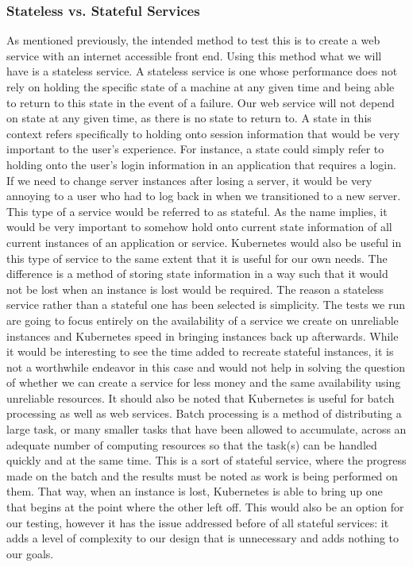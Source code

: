 \documentclass[thesis,proposal]{umassthesis}  %
\begin{document}
\subsubsection{Stateless vs. Stateful Services}
	As mentioned previously, the intended method to test this is to create a web service with an internet accessible front end. Using this method what we will have is a stateless service. A stateless service is one whose performance does not rely on holding the specific state of a machine at any given time and being able to return to this state in the event of a failure. Our web service will not depend on state at any given time, as there is no state to return to. A state in this context refers specifically to holding onto session information that would be very important to the user’s experience. For instance, a state could simply refer to holding onto the user’s login information in an application that requires a login. If we need to change server instances after losing a server, it would be very annoying to a user who had to log back in when we transitioned to a new server.
	This type of a service would be referred to as stateful. As the name implies, it would be very important to somehow hold onto current state information of all current instances of an application or service. Kubernetes would also be useful in this type of service to the same extent that it is useful for our own needs. The difference is a method of storing state information in a way such that it would not be lost when an instance is lost would be required. The reason a stateless service rather than a stateful one has been selected is simplicity. The tests we run are going to focus entirely on the availability of a service we create on unreliable instances and Kubernetes speed in bringing instances back up afterwards. While it would be interesting to see the time added to recreate stateful instances, it is not a worthwhile endeavor in this case and would not help in solving the question of whether we can create a service for less money and the same availability using unreliable resources.
	It should also be noted that Kubernetes is useful for batch processing as well as web services. Batch processing is a method of distributing a large task, or many smaller tasks that have been allowed to accumulate, across an adequate number of computing resources so that the task(s) can be handled quickly and at the same time. This is a sort of stateful service, where the progress made on the batch and the results must be noted as work is being performed on them. That way, when an instance is lost, Kubernetes is able to bring up one that begins at the point where the other left off. This would also be an option for our testing, however it has the issue addressed before of all stateful services: it adds a level of complexity to our design that is unnecessary and adds nothing to our goals.
\end{document}
